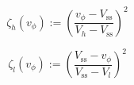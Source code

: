 \begin{equation}
	\zeta_h(v_\phi) := \left(\frac{v_\phi-V_\text{ss}}{V_h-V_\text{ss}}\right)^{2}
	\label{ch1:equ:high-voltage-threshold-cost-simple}
\end{equation}

\begin{equation}
	\zeta_l(v_\phi) := \left(\frac{V_\text{ss}-v_\phi}{V_\text{ss}-V_l}\right)^{2}
	\label{ch1:equ:low-voltage-threshold-cost-simple}
\end{equation}